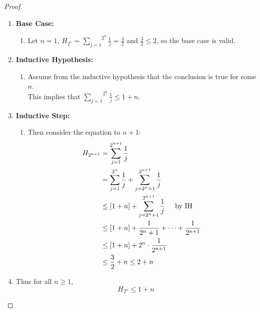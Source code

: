 \documentclass[class=article, crop=false]{standalone}
\def\inlinesum#1#2{\overset{#2}{\underset{#1}{\sum}}}
\begin{document}
\subsubsection{}
\begin{proof}
	$ $
	\begin{enumerate}
	  \item[] \textbf{Base Case:}
		\begin{enumerate}
		  \item[] Let $n=1$, $H_{2^1}=\inlinesum{j=1}{2^n}\frac1j = \frac32$ and $\frac32 \leq 2$, so the base case is valid.
		\end{enumerate} 
	  \item[] \textbf{Inductive Hypothesis:}
		\begin{enumerate}
		  \item[] Assume from the inductive hypothesis that the conclusion is true for some $n$. \\
		  This implies that $\inlinesum{j=1}{2^n}\frac1j \leq 1+n$.
		\end{enumerate}
	  \item[] \textbf{Inductive Step:}
		\begin{enumerate}
		  \item[] Then consider the equation to $n+1$:
			\begin{align*}
			  H_{2^{n+1}} &= \sum_{j=1}^{2^{n+1}} \frac{1}{j} \\
			  &= \sum_{j=1}^{2^n} \frac{1}{j} + \sum_{j=2^n +1}^{2^{n+1}} \frac{1}{j} \\
			  &\leq \left[1+n\right] + \sum_{j=2^n +1}^{2^{n+1}} \frac{1}{j} \hspace{5mm}\text{by IH} \\
			  &\leq \left[1+n\right] + \frac{1}{2^n +1}+\cdots +\frac{1}{2^{n+1}}\\
			  &\leq \left[1+n\right] + 2^n\cdot \frac{1}{2^{n+1}} \\
			  &\leq \frac{3}{2} + n \leq 2 + n
			\end{align*}
		\end{enumerate}
	  \item[] Thus for all $n\geq 1$, $$H_{2^n}\leq 1+n$$
	\end{enumerate}
  \end{proof}
\end{document}

